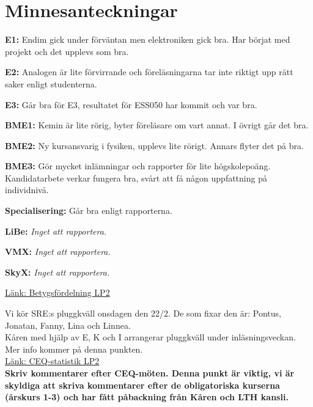 \documentclass[10pt]{article}
\begin{document}
\section*{Minnesanteckningar}
\begin{paragrafer}
\textbf{E1:} Endim gick under förväntan men elektroniken gick bra. Har börjat med projekt och det upplevs som bra.

\textbf{E2:} Analogen är lite förvirrande och föreläsningarna tar inte riktigt upp rätt saker enligt studenterna.

\textbf{E3:} Går bra för E3, resultatet för ESS050 har kommit och var bra.

\textbf{BME1:} Kemin är lite rörig, byter föreläsare om vart annat. I övrigt går det bra.

\textbf{BME2:} Ny kursansvarig i fysiken, upplevs lite rörigt. Annars flyter det på bra. 

\textbf{BME3:} Gör mycket inlämningar och rapporter för lite högskolepoäng. Kandidatarbete verkar fungera bra, svårt att få någon uppfattning på individnivå.

\textbf{Specialisering:} Går bra enligt rapporterna.

\textbf{LiBe:} \textit{Inget att rapportera.}

\textbf{VMX:} \textit{Inget att rapportera.}

\textbf{SkyX:} \textit{Inget att rapportera.}

\href{https://docs.google.com/spreadsheets/d/1Lir7Day7pFARq_1cz4DDdfcUisUunIAgXFzi4WWim2Q/edit?usp=sharing}{Länk: Betygsfördelning LP2}

Vi kör SRE:s pluggkväll onsdagen den 22/2. De som fixar den är: Pontus, Jonatan, Fanny, Lina och Linnea. \\
Kåren med hjälp av E, K och I arrangerar pluggkväll under inläsningsveckan. Mer info kommer på denna punkten.
\\
\href{https://docs.google.com/spreadsheets/d/1Dgv3cSbv8l1XRmSr6SsRmVqKaI-y6OlmmdPo7TC9YME/edit?usp=sharing}{Länk: CEQ-statistik LP2} \\ 
\textbf{Skriv kommentarer efter CEQ-möten. Denna punkt är viktig, vi är skyldiga att skriva kommentarer efter de obligatoriska kurserna (årskurs 1-3) och har fått påbackning från Kåren och LTH kansli.}


\end{paragrafer}
\end{document}
